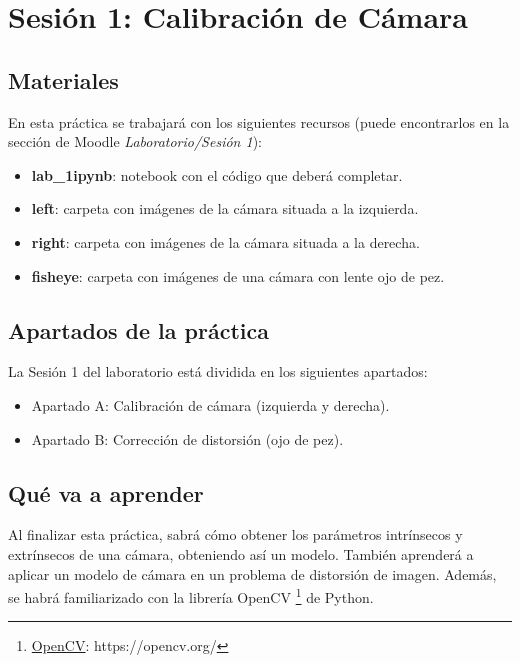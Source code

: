\chapter{Sesión 1: Calibración de Cámara}
\label{chapter:introduction_ses_1}

\section{Materiales}
En esta práctica se trabajará con los siguientes recursos (puede encontrarlos en la sección de Moodle \textit{Laboratorio/Sesión 1}):

\begin{itemize}
    \item \textbf{lab\_1ipynb}: notebook con el código que deberá completar.
    \item \textbf{left}: carpeta con imágenes de la cámara situada a la izquierda.
    \item \textbf{right}: carpeta con imágenes de la cámara situada a la derecha.
    \item \textbf{fisheye}: carpeta con imágenes de una cámara con lente ojo de pez.
\end{itemize}

\section{Apartados de la práctica}
La Sesión 1 del laboratorio está dividida en los siguientes apartados:

\begin{itemize}
    \item Apartado A: Calibración de cámara (izquierda y derecha).
    \item Apartado B:  Corrección de distorsión (ojo de pez).
\end{itemize}

\section{Qué va a aprender}

Al finalizar esta práctica, sabrá cómo obtener los parámetros intrínsecos y extrínsecos de una cámara, obteniendo así un modelo. También aprenderá a aplicar un modelo de cámara en un problema de distorsión de imagen. Además, se habrá familiarizado con la librería OpenCV \footnote{\href{https://opencv.org/}{OpenCV}: https://opencv.org/} de Python.